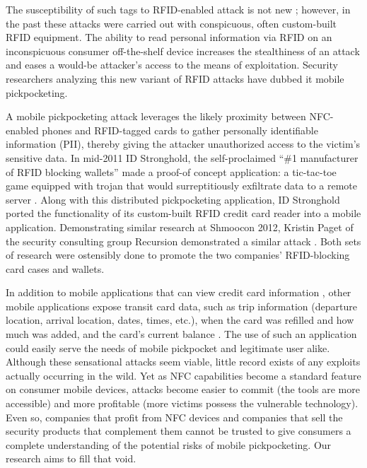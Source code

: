 \documentclass{sig-alternate}
\begin{document}
The susceptibility of such tags to RFID-enabled attack is not new \cite{picking-virtual-pockets} \cite{eavesdropping-attacks-hfrfid-tokens}; however, in the past these attacks were carried out with conspicuous, often custom-built RFID equipment.  The ability to read personal information via RFID on an inconspicuous consumer off-the-shelf device increases the stealthiness of an attack and eases a would-be attacker's access to the means of exploitation.  Security researchers analyzing this new variant of RFID attacks have dubbed it mobile pickpocketing.  

A mobile pickpocketing attack leverages the likely proximity between NFC-enabled phones and RFID-tagged cards to gather personally identifiable information (PII), thereby giving the attacker unauthorized access to the victim's sensitive data.  In mid-2011 ID Stronghold, the self-proclaimed ``\#1 manufacturer of RFID blocking wallets'' \cite{idstronghold-1} made a proof-of concept application:  a tic-tac-toe game equipped with trojan that would surreptitiously exfiltrate data to a remote server \cite{11alive-electronic-pickpocket-apps}.  Along with this distributed pickpocketing application, ID Stronghold ported the functionality of its custom-built RFID credit card reader into a mobile application.  Demonstrating similar research at Shmoocon 2012, Kristin Paget of the security consulting group Recursion demonstrated a similar attack \cite{forbes-1}.  Both sets of research were ostensibly done to promote the two companies' RFID-blocking card cases and wallets.  

In addition to mobile applications that can view credit card information \cite{idstronghold-1}, other mobile applications expose transit card data, such as trip information (departure location, arrival location, dates, times, etc.), when the card was refilled and how much was added, and the card's current balance \cite{farebot-1}.  The use of such an application could easily serve the needs of mobile pickpocket and legitimate user alike.  Although these sensational attacks seem viable, little record exists of any exploits actually occurring in the wild.  Yet as NFC capabilities become a standard feature on consumer mobile devices, attacks become easier to commit (the tools are more accessible) and more profitable (more victims possess the vulnerable technology).  Even so, companies that profit from NFC devices and companies that sell the security products that complement them cannot be trusted to give consumers a complete understanding of the potential risks of mobile pickpocketing.  Our research aims to fill that void.
\end{document}
